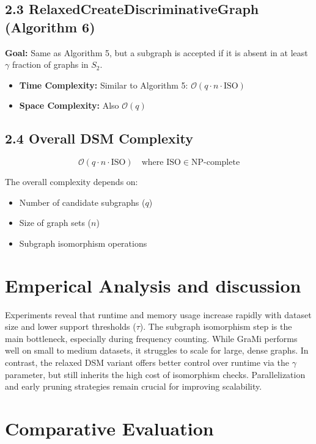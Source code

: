 \documentclass[10pt]{article}
\begin{document}
\subsection*{2.3 RelaxedCreateDiscriminativeGraph (Algorithm 6)}
\textbf{Goal:} Same as Algorithm 5, but a subgraph is accepted if it is absent in at least $\gamma$ fraction of graphs in $S_2$.

\begin{itemize}[noitemsep]
    \item \textbf{Time Complexity:} Similar to Algorithm 5: $\mathcal{O}(q \cdot n \cdot \text{ISO})$
    \item \textbf{Space Complexity:} Also $\mathcal{O}(q)$
\end{itemize}

\subsection*{2.4 Overall DSM Complexity}

\[
\mathcal{O}(q \cdot n \cdot \text{ISO}) \quad \text{where } \text{ISO} \in \text{NP-complete}
\]

\noindent The overall complexity depends on:
\begin{itemize}[noitemsep]
    \item Number of candidate subgraphs ($q$)
    \item Size of graph sets ($n$)
    \item Subgraph isomorphism operations
\end{itemize}
\section{Emperical Analysis and discussion}

Experiments reveal that runtime and memory usage increase rapidly with dataset size and lower support thresholds ($\tau$). The subgraph isomorphism step is the main bottleneck, especially during frequency counting. While GraMi performs well on small to medium datasets, it struggles to scale for large, dense graphs. In contrast, the relaxed DSM variant offers better control over runtime via the $\gamma$ parameter, but still inherits the high cost of isomorphism checks. Parallelization and early pruning strategies remain crucial for improving scalability.

\section{Comparative Evaluation}
\end{document}
